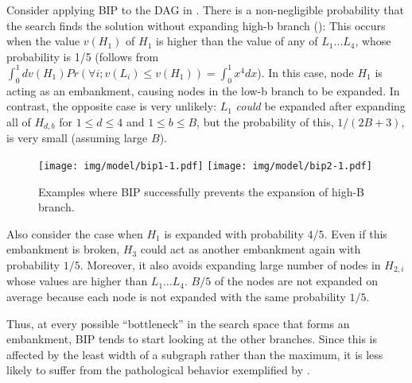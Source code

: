 Consider applying BIP to the DAG in .
There is a non-negligible probability that the search finds the solution without expanding high-b branch ():
This occurs when the value $v(H_1)$ of $H_1$ is higher than the value of any of $L_1\ldots L_4$,
whose probability is 1/5
 (follows from $\int_0^1 dv(H_1) Pr(\forall i; v(L_i)\leq v(H_1)) = \int_0^1 x^4dx$). 
In this case, node $H_1$ is acting as an embankment, causing nodes in the  low-b branch to be expanded.
In contrast, the opposite case is very unlikely:
$L_1$ \emph{could} be expanded after expanding all of $H_{d,b}$ for $1\leq d\leq 4$ and $1\leq b \leq B$,
 but the probability of this,  $1/(2B+3)$,  is very small (assuming large $B$).

\begin{figure}[htb]
 \centering
 \texttt{[image: img/model/bip1-1.pdf]}
 \texttt{[image: img/model/bip2-1.pdf]}
 \caption{Examples where BIP successfully prevents the expansion of high-B branch.}
 \label{fig:ip-success}
\end{figure}

Also consider the case when $H_1$ is expanded with probability $4/5$.
Even if this embankment is broken, $H_3$ could act as another embankment again with probability $1/5$.
Moreover, it also avoids expanding large number of nodes in $H_{2,i}$ whose values are higher than $L_1\ldots L_4$.
$B/5$ of the nodes are not expanded on average because each node is not expanded with the same probability $1/5$.

Thus, at every possible ``bottleneck'' in the search space that forms an embankment, BIP tends to start looking at the other branches.
Since this is affected by the least width of a subgraph rather than the maximum,
it is less likely to suffer from the pathological behavior exemplified by .


